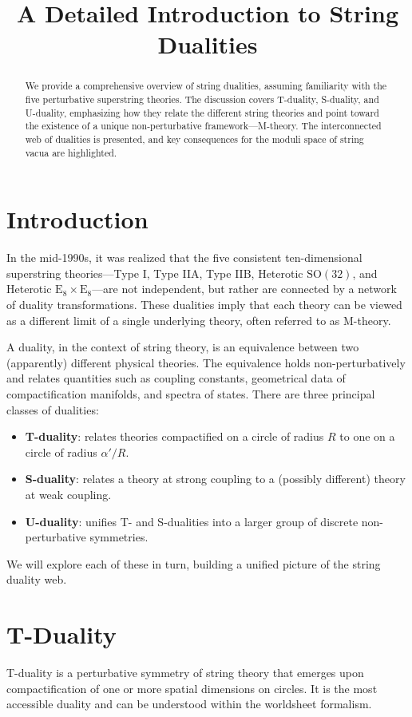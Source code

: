 \documentclass[11pt]{article}
\title{A Detailed Introduction to String Dualities}
\author{}
\date{}
\begin{document}
\maketitle

\begin{abstract}
We provide a comprehensive overview of string dualities, assuming familiarity with the five perturbative superstring theories. The discussion covers T-duality, S-duality, and U-duality, emphasizing how they relate the different string theories and point toward the existence of a unique non-perturbative framework---M-theory. The interconnected web of dualities is presented, and key consequences for the moduli space of string vacua are highlighted.
\end{abstract}

\section{Introduction}
In the mid-1990s, it was realized that the five consistent ten-dimensional superstring theories---Type I, Type IIA, Type IIB, Heterotic $\mathrm{SO}(32)$, and Heterotic $\mathrm{E}_8\times\mathrm{E}_8$---are not independent, but rather are connected by a network of duality transformations. These dualities imply that each theory can be viewed as a different limit of a single underlying theory, often referred to as M-theory.

A duality, in the context of string theory, is an equivalence between two (apparently) different physical theories. The equivalence holds non-perturbatively and relates quantities such as coupling constants, geometrical data of compactification manifolds, and spectra of states. There are three principal classes of dualities:
\begin{itemize}
    \item \textbf{T-duality}: relates theories compactified on a circle of radius $R$ to one on a circle of radius $\alpha'/R$.
    \item \textbf{S-duality}: relates a theory at strong coupling to a (possibly different) theory at weak coupling.
    \item \textbf{U-duality}: unifies T- and S-dualities into a larger group of discrete non-perturbative symmetries.
\end{itemize}
We will explore each of these in turn, building a unified picture of the string duality web.

\section{T-Duality}
T-duality is a perturbative symmetry of string theory that emerges upon compactification of one or more spatial dimensions on circles. It is the most accessible duality and can be understood within the worldsheet formalism.
\end{document}
